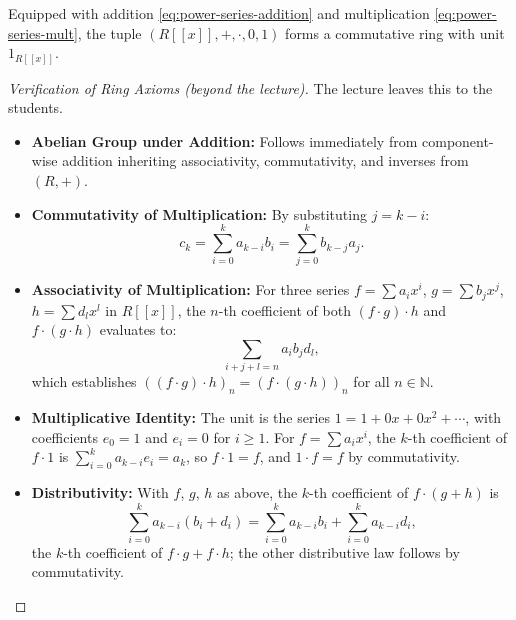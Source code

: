 \begin{content}
Equipped with addition \eqref{eq:power-series-addition} and multiplication \eqref{eq:power-series-mult}, the tuple $(R[[x]], +, \cdot, 0, 1)$ forms a commutative ring with unit $1_{R[[x]]}$.

\begin{proof}[Verification of Ring Axioms (beyond the lecture)]
The lecture leaves this to the students.
\begin{itemize}
    \item \textbf{Abelian Group under Addition:} Follows immediately from component-wise addition inheriting associativity, commutativity, and inverses from $(R, +)$.
    \item \textbf{Commutativity of Multiplication:} By substituting $j = k - i$:
    \[
    c_k = \sum_{i=0}^k a_{k-i} b_i = \sum_{j=0}^k b_{k-j} a_j.
    \]
    \item \textbf{Associativity of Multiplication:} For three series $f = \sum a_i x^i$, $g = \sum b_j x^j$, $h = \sum d_l x^l$ in $R[[x]]$, the $n$-th coefficient of both $(f \cdot g) \cdot h$ and $f \cdot (g \cdot h)$ evaluates to:
    \[
    \sum_{i+j+l=n} a_i b_j d_l,
    \]
    which establishes $((f \cdot g) \cdot h)_n = (f \cdot (g \cdot h))_n$ for all $n \in \mathbb{N}$.
    \item \textbf{Multiplicative Identity:} The unit is the series $1 = 1 + 0x + 0x^2 + \cdots$, with coefficients $e_0 = 1$ and $e_i = 0$ for $i \ge 1$. For $f = \sum a_i x^i$, the $k$-th coefficient of $f \cdot 1$ is $\sum_{i=0}^k a_{k-i} e_i = a_k$, so $f \cdot 1 = f$, and $1 \cdot f = f$ by commutativity.
    \item \textbf{Distributivity:} With $f$, $g$, $h$ as above, the $k$-th coefficient of $f \cdot (g + h)$ is
    \[
    \sum_{i=0}^k a_{k-i} (b_i + d_i) = \sum_{i=0}^k a_{k-i} b_i + \sum_{i=0}^k a_{k-i} d_i,
    \]
    the $k$-th coefficient of $f \cdot g + f \cdot h$; the other distributive law follows by commutativity.
\end{itemize}
\end{proof}
\end{content}

